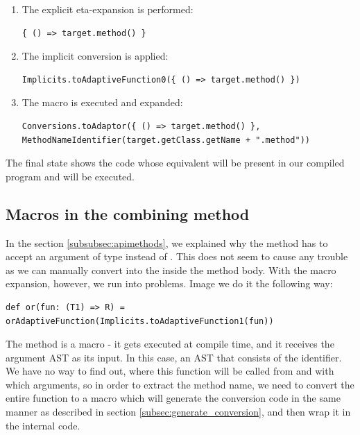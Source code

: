 \begin{enumerate}
	\item The explicit eta-expansion is performed:
	\lstset{style=Scala}
	\begin{lstlisting}
{ () => target.method() }
	\end{lstlisting}
	\item The implicit conversion is applied:
		\lstset{style=Scala}
	\begin{lstlisting}
Implicits.toAdaptiveFunction0({ () => target.method() })
		\end{lstlisting}
		\item The macro  is executed and expanded:
		\lstset{style=Scala}
		\begin{lstlisting}
Conversions.toAdaptor({ () => target.method() }, MethodNameIdentifier(target.getClass.getName + ".method"))
		\end{lstlisting}
\end{enumerate}

The final state shows the code whose equivalent will be present in our compiled program and will be executed.

\subsection{Macros in the combining method}

In the section \ref{subsubsec:apimethods}, we explained why the  method has to accept an argument of  type instead of . This does not seem to cause any trouble as we can manually convert  into the  inside the method body. With the macro expansion, however, we run into problems. Image we do it the following way:
\lstset{style=Scala}
\begin{lstlisting}
def or(fun: (T1) => R) = orAdaptiveFunction(Implicits.toAdaptiveFunction1(fun))
\end{lstlisting}

The   method is a macro - it gets executed at compile time, and it receives the argument AST as its input. In this case, an AST that consists of the  identifier. We have no way to find out, where this function will be called from and with which arguments, so in order to extract the method name, we need to convert the entire  function to a macro which will generate the conversion code in the same manner as described in section \ref{subsec:generate_conversion}, and then wrap it in the internal  code.

